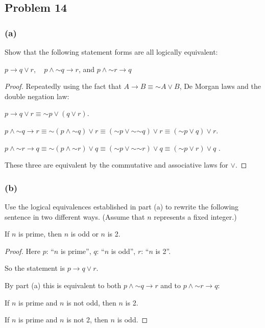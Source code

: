 \documentclass[14pt]{extarticle}
\begin{document}
\subsection{Problem 14}
\subsubsection{(a)}
Show that the following statement forms are all logically equivalent:

$p \to q \vee r$, \,\,\, $p \wedge {\sim q} \to r$, and $p \wedge {\sim r} \to q$

\begin{proof}
Repeatedly using the fact that $A \to B \equiv {\sim A} \vee B$, De Morgan laws and the double negation law:

$p \to q \vee r \equiv {\sim p} \vee (q \vee r)$.

$p \wedge {\sim q} \to r \equiv {\sim (p \wedge {\sim q}) \vee r} \equiv ({\sim p} \vee {\sim {\sim q}}) \vee r \equiv ({\sim p} \vee q) \vee r$.

$p \wedge {\sim r} \to q \equiv {\sim (p \wedge {\sim r}) \vee q} \equiv ({\sim p} \vee {\sim {\sim r}}) \vee q \equiv ({\sim p} \vee r) \vee q$ .

These three are equivalent by the commutative and associative laws for $\vee$.
\end{proof}

\subsubsection{(b)}
Use the logical equivalences established in part (a) to rewrite the following sentence in two different ways. (Assume that $n$ represents a fixed integer.)

\begin{center}
If $n$ is prime, then $n$ is odd or $n$ is 2.
\end{center}

\begin{proof}
Here $p$: ``$n$ is prime'', $q$: ``$n$ is odd'', $r$: ``$n$ is 2''.

So the statement is $p \to q \vee r$.

By part (a) this is equivalent to both $p \wedge {\sim q} \to r$ and to $p \wedge {\sim r} \to q$:

If $n$ is prime and $n$ is not odd, then $n$ is 2.

If $n$ is prime and $n$ is not 2, then $n$ is odd.
\end{proof}
\end{document}
